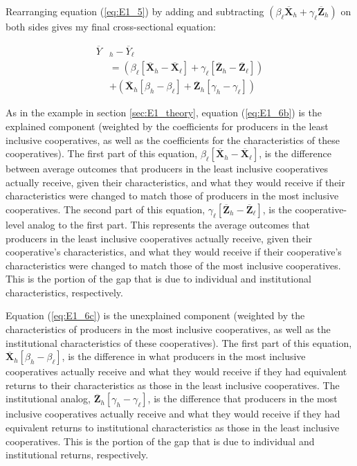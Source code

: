 \documentclass[11pt]{article}
\begin{document}
Rearranging equation (\ref{eq:E1_5}) by adding and subtracting $(\beta_{\ell}\overline{\mathbf{X}}_{h} + \gamma_{\ell}\overline{\mathbf{Z}}_{h})$ on both sides gives my final cross-sectional equation:

\begin{subequations}
    \begin{align}
        \overline{Y}&_{h} - \overline{Y}_{\ell} \label{eq:E1_6a} \\
        &= (\beta_{\ell}[\overline{\mathbf{X}}_{h} - \overline{\mathbf{X}}_{\ell}] + \gamma_{\ell}[\overline{\mathbf{Z}}_{h} - \overline{\mathbf{Z}}_{\ell}]) \label{eq:E1_6b} \\
        &+ (\overline{\mathbf{X}}_{h}[\beta_{h} - \beta_{\ell}] + \overline{\mathbf{Z}}_{h}[\gamma_{h} - \gamma_{\ell}]) \label{eq:E1_6c}
    \end{align}
\end{subequations}  

As in the example in section \ref{sec:E1_theory}, equation (\ref{eq:E1_6b}) is the explained component (weighted by the coefficients for producers in the least inclusive cooperatives, as well as the coefficients for the characteristics of these cooperatives). The first part of this equation, $\beta_{\ell}[\overline{\mathbf{X}}_{h} - \overline{\mathbf{X}}_{\ell}]$, is the difference between average outcomes that producers in the least inclusive cooperatives actually receive, given their characteristics, and what they would receive if their characteristics were changed to match those of producers in the most inclusive cooperatives. The second part of this equation, $\gamma_{\ell}[\overline{\mathbf{Z}}_{h} - \overline{\mathbf{Z}}_{\ell}]$, is the cooperative-level analog to the first part. This represents the average outcomes that producers in the least inclusive cooperatives actually receive, given their cooperative's characteristics, and what they would receive if their cooperative's characteristics were changed to match those of the most inclusive cooperatives. This is the portion of the gap that is due to individual and institutional characteristics, respectively.

Equation (\ref{eq:E1_6c}) is the unexplained component (weighted by the characteristics of producers in the most inclusive cooperatives, as well as the institutional characteristics of these cooperatives). The first part of this equation, $\overline{\mathbf{X}}_{h}[\beta_{h} - \beta_{\ell}]$, is the difference in what producers in the most inclusive cooperatives actually receive and what they would receive if they had equivalent returns to their characteristics as those in the least inclusive cooperatives. The institutional analog, $\overline{\mathbf{Z}}_{h}[\gamma_{h} - \gamma_{\ell}]$, is the difference that producers in the most inclusive cooperatives actually receive and what they would receive if they had equivalent returns to institutional characteristics as those in the least inclusive cooperatives. This is the portion of the gap that is due to individual and institutional returns, respectively. \\
\end{document}
